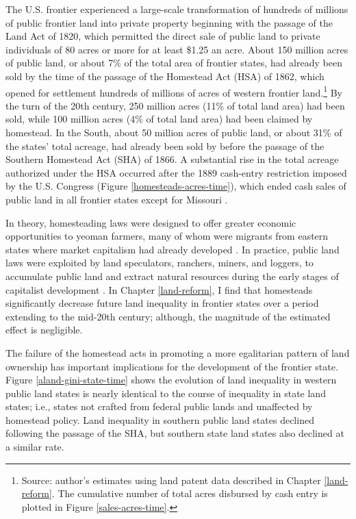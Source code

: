 The U.S. frontier experienced a large-scale transformation of hundreds of millions of public frontier land into private property beginning with the passage of the Land Act of 1820, which permitted the direct sale of public land to private individuals of 80 acres or more for at least \$1.25 an acre. About 150 million acres of public land, or about 7\% of the total area of frontier states, had already been sold by the time of the passage of the Homestead Act (HSA) of 1862, which opened for settlement hundreds of millions of acres of western frontier land.\footnote{Source: author's estimates using land patent data described in Chapter \ref{land-reform}. The cumulative number of total acres disbursed by cash entry is plotted in Figure \ref{sales-acres-time}.} By the turn of the 20th century, 250 million acres (11\% of total land area) had been sold, while 100 million acres (4\% of total land area) had been claimed by homestead. In the South, about 50 million acres of public land, or about 31\% of the states' total acreage, had already been sold by before the passage of the Southern Homestead Act (SHA) of 1866. A substantial rise in the total acreage authorized under the HSA occurred after the 1889 cash-entry restriction imposed by the U.S. Congress (Figure \ref{homesteads-acres-time}), which ended cash sales of public land in all frontier states except for Missouri \citep{gates1940federal}.

In theory, homesteading laws were designed to offer greater economic opportunities to yeoman farmers, many of whom were migrants from eastern states where market capitalism had already developed \citep{kulikoff1992agrarian}. In practice, public land laws were exploited by land speculators, ranchers, miners, and loggers, to accumulate public land and extract natural resources during the early stages of capitalist development \citep{murtazashvili2013political}. In Chapter \ref{land-reform}, I find that homesteads significantly decrease future land inequality in frontier states over a period extending to the mid-20th century; although, the magnitude of the estimated effect is negligible.

The failure of the homestead acts in promoting a more egalitarian pattern of land ownership has important implications for the development of the frontier state. Figure \ref{aland-gini-state-time} shows the evolution of land inequality in western public land states is nearly identical to the course of inequality in state land states; i.e., states not crafted from federal public lands and unaffected by homestead policy. Land inequality in southern public land states declined following the passage of the SHA, but southern state land states also declined at a similar rate. 

